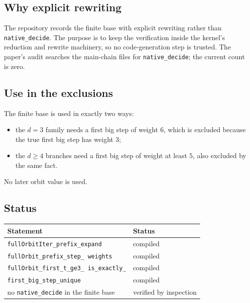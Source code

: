 \subsection{Why explicit rewriting}

The repository records the finite base with explicit rewriting rather
than \texttt{native\_decide}.  The purpose is to keep the verification
inside the kernel's reduction and rewrite machinery, so no
code-generation step is trusted.  The paper's audit searches the
main-chain files for \texttt{native\_decide}; the current count is
zero.

\subsection{Use in the exclusions}

The finite base is used in exactly two ways:
\begin{itemize}[leftmargin=*]
\item the $d=3$ family needs a first big step of weight $6$, which is
  excluded because the true first big step has weight $3$;
\item the $d\ge4$ branches need a first big step of weight at least
  $5$, also excluded by the same fact.
\end{itemize}
No later orbit value is used.

\subsection{Status}

\begin{center}
\small
\begin{tabular}{@{}p{}p{}@{}}
\toprule
Statement & Status \\
\midrule
\texttt{fullOrbitIter\_\allowbreak prefix\_\allowbreak expand} &
  compiled \\
\texttt{fullOrbit\_\allowbreak prefix\_\allowbreak step\_\allowbreak
weights} & compiled \\
\texttt{fullOrbit\_\allowbreak first\_\allowbreak t\_\allowbreak ge3\_
\allowbreak is\_\allowbreak exactly\_\allowbreak 3} & compiled \\
\texttt{first\_\allowbreak big\_\allowbreak step\_\allowbreak unique} &
  compiled \\
no \texttt{native\_decide} in the finite base & verified by inspection \\
\bottomrule
\end{tabular}
\end{center}
